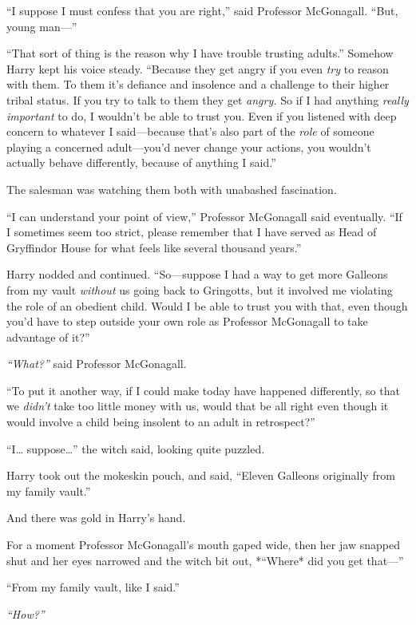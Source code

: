 ``I suppose I must confess that you are right,'' said Professor
McGonagall. ``But, young man---''

``That sort of thing is the reason why I have trouble trusting adults.''
Somehow Harry kept his voice steady. ``Because they get angry if you
even \emph{try} to reason with them. To them it's defiance and insolence
and a challenge to their higher tribal status. If you try to talk to
them they get \emph{angry.} So if I had anything \emph{really}
\emph{important} to do, I wouldn't be able to trust you. Even if you
listened with deep concern to whatever I said---because that's also part
of the \emph{role} of someone playing a concerned adult---you'd never
change your actions, you wouldn't actually behave differently, because
of anything I said.''

The salesman was watching them both with unabashed fascination.

``I can understand your point of view,'' Professor McGonagall said
eventually. ``If I sometimes seem too strict, please remember that I
have served as Head of Gryffindor House for what feels like several
thousand years.''

Harry nodded and continued. ``So---suppose I had a way to get more
Galleons from my vault \emph{without} us going back to Gringotts, but it
involved me violating the role of an obedient child. Would I be able to
trust you with that, even though you'd have to step outside your own
role as Professor McGonagall to take advantage of it?''

\emph{``What?''} said Professor McGonagall.

``To put it another way, if I could make today have happened
differently, so that we \emph{didn't} take too little money with us,
would that be all right even though it would involve a child being
insolent to an adult in retrospect?''

``I\ldots{} suppose\ldots{}'' the witch said, looking quite puzzled.

Harry took out the mokeskin pouch, and said, ``Eleven Galleons
originally from my family vault.''

And there was gold in Harry's hand.

For a moment Professor McGonagall's mouth gaped wide, then her jaw
snapped shut and her eyes narrowed and the witch bit out, *``Where* did
you get that---''

``From my family vault, like I said.''

\emph{``How?''}

